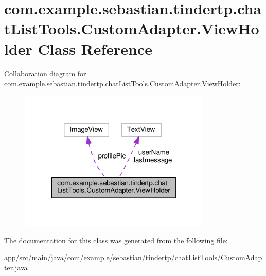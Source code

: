 \hypertarget{classcom_1_1example_1_1sebastian_1_1tindertp_1_1chatListTools_1_1CustomAdapter_1_1ViewHolder}{}\section{com.\+example.\+sebastian.\+tindertp.\+chat\+List\+Tools.\+Custom\+Adapter.\+View\+Holder Class Reference}
\label{classcom_1_1example_1_1sebastian_1_1tindertp_1_1chatListTools_1_1CustomAdapter_1_1ViewHolder}


Collaboration diagram for com.\+example.\+sebastian.\+tindertp.\+chat\+List\+Tools.\+Custom\+Adapter.\+View\+Holder\+:\nopagebreak
\begin{figure}[H]
\begin{center}
\leavevmode
\includegraphics[width=260pt]{classcom_1_1example_1_1sebastian_1_1tindertp_1_1chatListTools_1_1CustomAdapter_1_1ViewHolder__coll__graph}
\end{center}
\end{figure}


The documentation for this class was generated from the following file\+:\begin{DoxyCompactItemize}
\item 
app/src/main/java/com/example/sebastian/tindertp/chat\+List\+Tools/Custom\+Adapter.\+java\end{DoxyCompactItemize}
